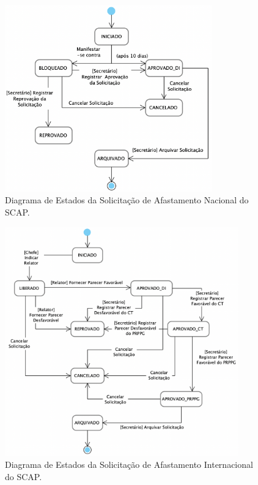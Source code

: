 \begin{figure}[h!]
    \centering
    \includegraphics[width=0.8\textwidth]{figuras/fig-diagrama-estado-nacional.png}
    \caption{Diagrama de Estados da Solicitação de Afastamento Nacional do SCAP.}
    \label{fig-diagrama-estado-nacional}
\end{figure}


\begin{figure}[h!]
    \centering
    \includegraphics[width=0.9\textwidth]{figuras/fig-diagrama-estado-internacional.png}
    \caption{Diagrama de Estados da Solicitação de Afastamento Internacional do SCAP.}
    \label{fig-diagrama-estado-internacional}
\end{figure}



